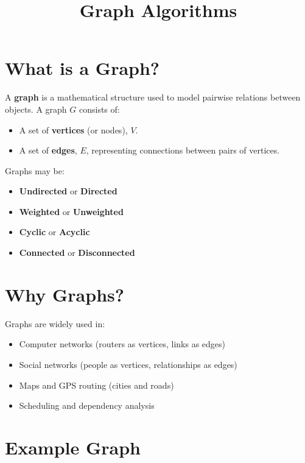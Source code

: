 \documentclass{article}
\title{Graph Algorithms}
\author{}
\date{}
\begin{document}
\maketitle


\section{What is a Graph?}

A \textbf{graph} is a mathematical structure used to model pairwise relations between objects. A graph $G$ consists of:
\begin{itemize}
    \item A set of \textbf{vertices} (or nodes), $V$.
    \item A set of \textbf{edges}, $E$, representing connections between pairs of vertices.
\end{itemize}

Graphs may be:
\begin{itemize}
    \item \textbf{Undirected} or \textbf{Directed}
    \item \textbf{Weighted} or \textbf{Unweighted}
    \item \textbf{Cyclic} or \textbf{Acyclic}
    \item \textbf{Connected} or \textbf{Disconnected}
\end{itemize}

\section{Why Graphs?}

Graphs are widely used in:
\begin{itemize}
    \item Computer networks (routers as vertices, links as edges)
    \item Social networks (people as vertices, relationships as edges)
    \item Maps and GPS routing (cities and roads)
    \item Scheduling and dependency analysis
\end{itemize}

\section{Example Graph}

\begin{center}
\end{center}
\end{document}
